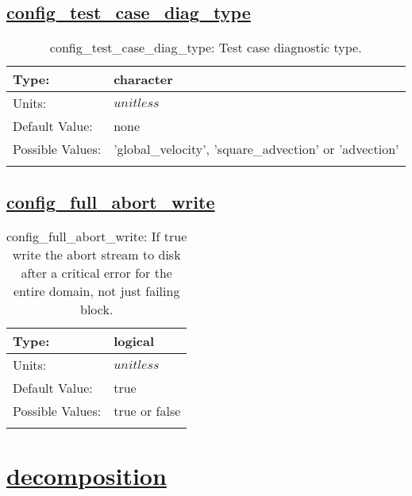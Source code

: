 \subsection[config\_test\_case\_diag\_type]{\hyperref[sec:nm_tab_io]{config\_test\_case\_diag\_type}}
\label{subsec:nm_sec_config_test_case_diag_type}
\begin{center}
\begin{longtable}{| p{2.0in} || p{4.0in} |}
    \hline
    Type: & character \\
    \hline
    Units: & $unitless$ \\
    \hline
    Default Value: & none \\
    \hline
    Possible Values: & 'global\_velocity', 'square\_advection' or 'advection' \\
    \hline
    \caption{config\_test\_case\_diag\_type: Test case diagnostic type.}
\end{longtable}
\end{center}
\subsection[config\_full\_abort\_write]{\hyperref[sec:nm_tab_io]{config\_full\_abort\_write}}
\label{subsec:nm_sec_config_full_abort_write}
\begin{center}
\begin{longtable}{| p{2.0in} || p{4.0in} |}
    \hline
    Type: & logical \\
    \hline
    Units: & $unitless$ \\
    \hline
    Default Value: & true \\
    \hline
    Possible Values: & true or false \\
    \hline
    \caption{config\_full\_abort\_write: If true write the abort stream to disk after a critical error for the entire domain, not just failing block.}
\end{longtable}
\end{center}
\section[decomposition]{\hyperref[sec:nm_tab_decomposition]{decomposition}}
\label{sec:nm_sec_decomposition}
